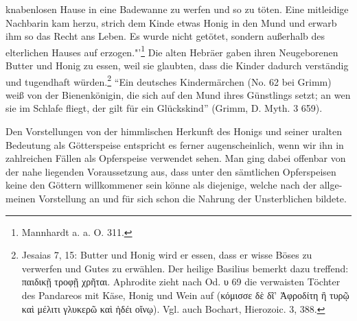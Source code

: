 \documentclass[a4paper, 11pt, oneside]{article}
\begin{document}
knabenlosen Hause in eine Badewanne zu werfen und so zu töten. Eine mitleidige Nachbarin kam herzu, strich dem Kinde etwas Honig in den Mund und erwarb ihm so das Recht ans Leben. Es wurde nicht getötet, sondern außerhalb des elterlichen Hauses auf erzogen."'\footnote{Mannhardt a. a. O. 311.} Die alten Hebräer gaben ihren Neugeborenen Butter und Honig zu essen, weil sie glaubten, dass die Kinder dadurch verständig und tugendhaft würden.\footnote{Jesaias 7, 15: Butter und Honig wird er essen, dass er wisse Böses zu verwerfen und Gutes zu erwählen. Der heilige Basilius bemerkt dazu treffend: παιδικῇ τροφῇ χρῆται. Aphrodite zieht nach Od. υ 69 die verwaisten Töchter des Pandareos mit Käse, Honig und Wein auf (κόμισσε δὲ δῖ' Ἀφροδίτη ἢ τυρῷ καὶ μέλιτι γλυκερῶ καὶ ἡδέι οἴνῳ). Vgl. auch Bochart, Hierozoic. 3, 388.} "`Ein deutsches Kindermärchen (No. 62 bei Grimm) weiß von der Bienenkönigin, die sich auf den Mund ihres Günstlings setzt; an wen sie im Schlafe fliegt, der gilt für ein Glückskind"' (Grimm, D. Myth. 3 659).

Den Vorstellungen von der himmlischen Herkunft des Honigs und seiner uralten Bedeutung als Götterspeise entspricht es ferner augenscheinlich, wenn wir ihn in zahlreichen Fällen als Opferspeise verwendet sehen. Man ging dabei offenbar von der nahe liegenden Voraussetzung aus, dass unter den sämtlichen Opferspeisen keine den Göttern willkommener sein könne als diejenige, welche nach der allge-meinen Vorstellung an und für sich schon die Nahrung der Unsterblichen bildete.
\end{document}
